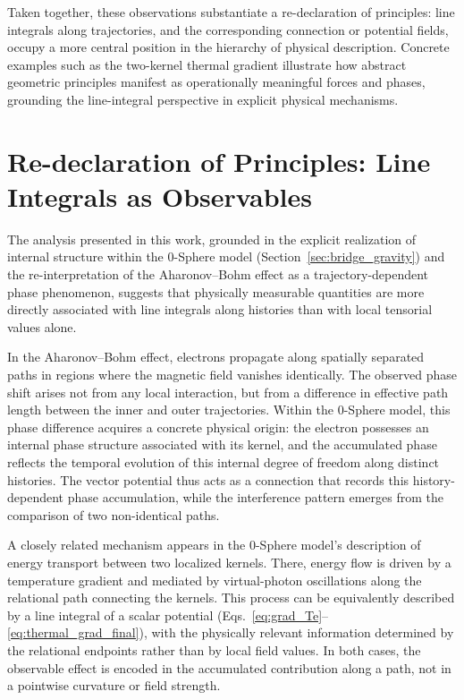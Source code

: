 \documentclass[%
 reprint,
 amsmath,amssymb,
 aps,
 prb,
]{revtex4-2}
\numberwithin{equation}{section}
\begin{document}
Taken together, these observations substantiate a re-declaration of principles: line integrals along trajectories, and the corresponding connection or potential fields, occupy a more central position in the hierarchy of physical description. Concrete examples such as the two-kernel thermal gradient illustrate how abstract geometric principles manifest as operationally meaningful forces and phases, grounding the line-integral perspective in explicit physical mechanisms.

\section{Re-declaration of Principles: Line Integrals as Observables}
\label{sec:redeclaration_line_integrals}

The analysis presented in this work, grounded in the explicit realization of internal structure within the 0-Sphere model (Section~\ref{sec:bridge_gravity}) and the re-interpretation of the Aharonov--Bohm effect as a trajectory-dependent phase phenomenon, suggests that physically measurable quantities are more directly associated with line integrals along histories than with local tensorial values alone.

In the Aharonov--Bohm effect, electrons propagate along spatially separated paths in regions where the magnetic field vanishes identically. The observed phase shift arises not from any local interaction, but from a difference in effective path length between the inner and outer trajectories. Within the 0-Sphere model, this phase difference acquires a concrete physical origin: the electron possesses an internal phase structure associated with its kernel, and the accumulated phase reflects the temporal evolution of this internal degree of freedom along distinct histories. The vector potential thus acts as a connection that records this history-dependent phase accumulation, while the interference pattern emerges from the comparison of two non-identical paths.

A closely related mechanism appears in the 0-Sphere model’s description of energy transport between two localized kernels. There, energy flow is driven by a temperature gradient and mediated by virtual-photon oscillations along the relational path connecting the kernels. This process can be equivalently described by a line integral of a scalar potential (Eqs.~\eqref{eq:grad_Te}–\eqref{eq:thermal_grad_final}), with the physically relevant information determined by the relational endpoints rather than by local field values. In both cases, the observable effect is encoded in the accumulated contribution along a path, not in a pointwise curvature or field strength.
\end{document}

